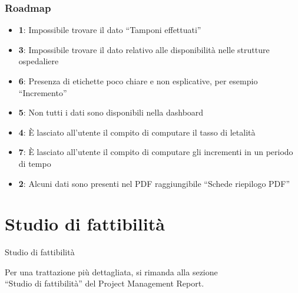 \documentclass[handout]{beamer}
\begin{document}
			\begin{frame}
				\frametitle{Roadmap}
				\begin{itemize}[<+->]
					\item<1-> \textbf{1}: Impossibile trovare il dato ``Tamponi effettuati''\\
					\item<2-> \textbf{3}: Impossibile trovare il dato relativo alle disponibilità nelle strutture ospedaliere\\
					\item<3-> \textbf{6}: Presenza di etichette poco chiare e non esplicative, per esempio ``Incremento''\\
					\item<4-> \textbf{5}: Non tutti i dati sono disponibili nella dashboard
					\item<5-> \textbf{4}: \`E lasciato all'utente il compito di computare il tasso di letalità\\
					\item<6-> \textbf{7}: \`E lasciato all'utente il compito di computare gli incrementi in un periodo di tempo\\
					\item<7-> \textbf{2}: Alcuni dati sono presenti nel PDF raggiungibile ``Schede riepilogo PDF''\\
				\end{itemize}
			\end{frame}

	\section{Studio di fattibilità}
		\begin{frame}
			\centering
			\begin{Huge}
				Studio di fattibilità
			\end{Huge}
			\mbox{}
			\vfill
			\vspace*{100px}
			\begin{scriptsize}
				Per una trattazione più dettagliata, si rimanda alla sezione\\``Studio di fattibilità'' del Project Management Report.
			\end{scriptsize}
		\end{frame}
\end{document}
